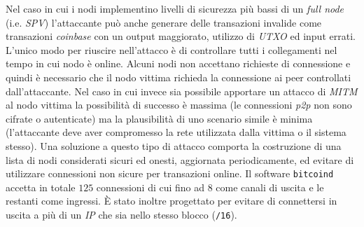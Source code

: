 Nel caso in cui i nodi implementino livelli di sicurezza più bassi di un \textit{full node} (i.e. \textit{SPV}) l'attaccante può anche generare delle transazioni invalide come transazioni \textit{coinbase} con un output maggiorato, utilizzo di \textit{UTXO} ed input errati.\newline
L'unico modo per riuscire nell'attacco è di controllare tutti i collegamenti nel tempo in cui nodo è online. Alcuni nodi non accettano richieste di connessione  e quindi è necessario che il nodo vittima richieda la connessione ai peer controllati dall'attaccante. Nel caso in cui invece sia possibile apportare un attacco di \textit{MITM} al nodo vittima la possibilità di successo è massima (le connessioni \textit{p2p} non sono cifrate o autenticate) ma la plausibilità di uno scenario simile è minima (l'attaccante deve aver compromesso la rete utilizzata dalla vittima o il sistema stesso).\newline
Una soluzione a questo tipo di attacco comporta la costruzione di una lista di nodi considerati sicuri ed onesti, aggiornata periodicamente, ed evitare di utilizzare connessioni non sicure per transazioni online.\newline
Il software \texttt{bitcoind} accetta in totale $125$ connessioni di cui fino ad $8$ come canali di uscita e le restanti come ingressi. È stato inoltre progettato per evitare di connettersi in uscita a più di un \textit{IP} che sia nello stesso blocco (\texttt{/16}).

